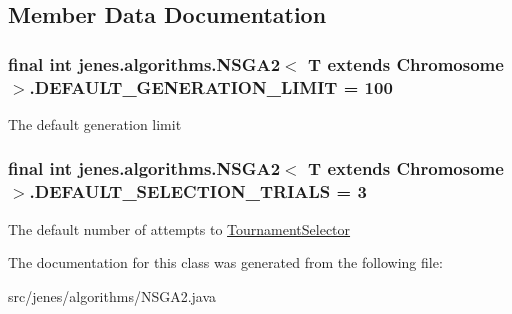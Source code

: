 \subsection{Member Data Documentation}
\hypertarget{classjenes_1_1algorithms_1_1_n_s_g_a2_3_01_t_01extends_01_chromosome_01_4_63cad03fd3ef9a70933b35dbe043b4ea}{
\subsubsection[DEFAULT\_\-GENERATION\_\-LIMIT]{\setlength{\rightskip}{0pt plus 5cm}final int jenes.algorithms.NSGA2$<$ T extends Chromosome $>$.{\bf DEFAULT\_\-GENERATION\_\-LIMIT} = 100}}
\label{classjenes_1_1algorithms_1_1_n_s_g_a2_3_01_t_01extends_01_chromosome_01_4_63cad03fd3ef9a70933b35dbe043b4ea}


The default generation limit \hypertarget{classjenes_1_1algorithms_1_1_n_s_g_a2_3_01_t_01extends_01_chromosome_01_4_a480c4702a4fbf2bb1ec8c8f9c7dc82b}{
\subsubsection[DEFAULT\_\-SELECTION\_\-TRIALS]{\setlength{\rightskip}{0pt plus 5cm}final int jenes.algorithms.NSGA2$<$ T extends Chromosome $>$.{\bf DEFAULT\_\-SELECTION\_\-TRIALS} = 3}}
\label{classjenes_1_1algorithms_1_1_n_s_g_a2_3_01_t_01extends_01_chromosome_01_4_a480c4702a4fbf2bb1ec8c8f9c7dc82b}


The default number of attempts to \hyperlink{}{TournamentSelector} 

The documentation for this class was generated from the following file:\begin{CompactItemize}
\item 
src/jenes/algorithms/NSGA2.java\end{CompactItemize}
